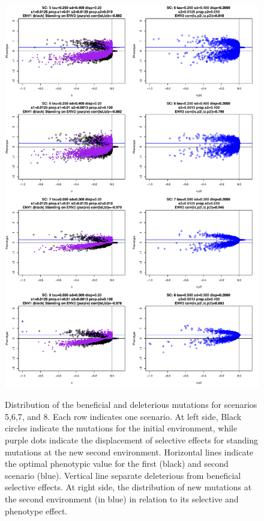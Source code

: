 \documentclass[a4paper,11pt]{article}
\begin{document}
\begin{figure}[h]
{\includegraphics[scale=0.45]{./Dist_ALLScenarios2.pdf}}
\caption{Distribution of the beneficial and deleterious mutations for scenarios 5,6,7, and 8. Each row indicates one scenario. At left side, Black circles indicate the mutations for the initial environment, while purple dots indicate the displacement of selective effects for standing mutations at the new second environment. Horizontal lines indicate the optimal phenotypic value for the first (black) and second scenario (blue). Vertical line separate deleterious from beneficial selective effects. At right side, the distribution of new mutations at the second environment (in blue) in relation to its selective and phenotype effect.}
\label{DistALLScenarios2}
\hspace*{-0.5cm}
\end{figure}
\end{document}
